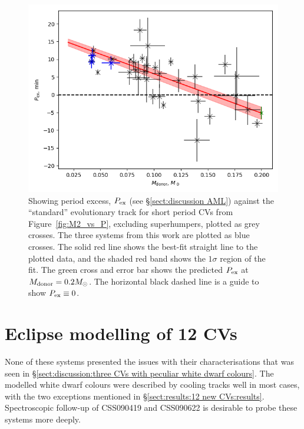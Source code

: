 \begin{figure}
    \centering
    \includegraphics[width=\columnwidth]{figures/results/three_cvs_with_weird_colours/GeneralFigs/p_excess_line_fit.png}
    \caption{Showing period excess, $P_{\rm ex}$ (see \S\ref{sect:discussion AML}) against the \citet{knigge11} ``standard'' evolutionary track for short period CVs from Figure~\ref{fig:M2_vs_P}, excluding superhumpers, plotted as grey crosses. The three systems from this work are plotted as blue crosses. The solid red line shows the best-fit straight line to the plotted data, and the shaded red band shows the $1\sigma$ region of the fit. The green cross and error bar shows the predicted $P_{\rm ex}$ at $M_{\rm donor} = 0.2 M_\odot$. The horizontal black dashed line is a guide to show $P_{\rm ex} \equiv 0$.}
    \label{fig:period excess}
\end{figure}


\section{Eclipse modelling of 12 CVs}
\label{sect:discussion:eclipse modelling of 12 CVs}

None of these systems presented the issues with their characterisations that was seen in \S\ref{sect:discussion:three CVs with peculiar white dwarf colours}. The modelled white dwarf colours were described by cooling tracks well in most cases, with the two exceptions mentioned in \S\ref{sect:results:12 new CVs:results}. Spectroscopic follow-up of CSS090419 and CSS090622 is desirable to probe these systems more deeply.

